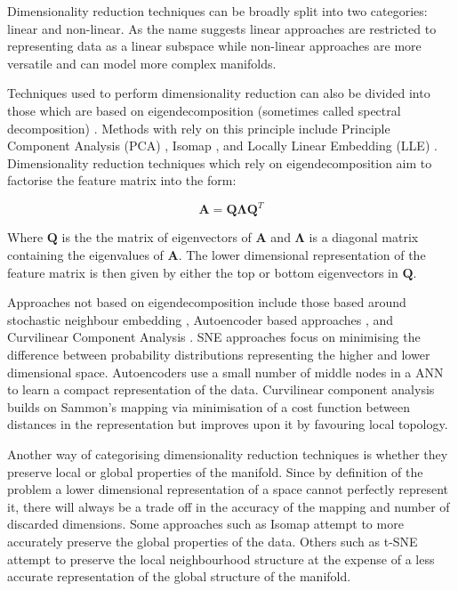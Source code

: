 Dimensionality reduction techniques can be broadly split into two categories: linear and non-linear. As the name suggests linear approaches are restricted to representing data as a linear subspace while non-linear approaches are more versatile and can model more complex manifolds. 

Techniques used to perform dimensionality reduction can also be divided into those which are based on eigendecomposition (sometimes called spectral decomposition)  \cite{strange2014open}. Methods with rely on this principle include Principle Component Analysis (PCA) \cite{shlens2014tutorial}, Isomap \cite{tenenbaum2000global}, and Locally Linear Embedding (LLE) \cite{roweis2000nonlinear}. Dimensionality reduction techniques which rely on eigendecomposition aim to factorise the feature matrix into the form:

\begin{equation}
	\bm{A} = \bm{Q}\bm{\Lambda}\bm{Q}^T
\end{equation}

Where $\bm{Q}$ is the the matrix of eigenvectors of $\bm{A}$ and $\bm{\Lambda}$ is a diagonal matrix containing the eigenvalues of $\bm{A}$. The lower dimensional representation of the feature matrix is then given by either the top or bottom eigenvectors in $\bm{Q}$.

Approaches not based on eigendecomposition include those based around stochastic neighbour embedding \cite{van2008visualizing, hinton2002stochastic}, Autoencoder based approaches \cite{hinton2006reducing}, and Curvilinear Component Analysis \cite{demartines1997curvilinear}. SNE approaches focus on minimising the difference between probability distributions representing the higher and lower dimensional space. Autoencoders use a small number of middle nodes in a ANN to learn a compact representation of the data. Curvilinear component analysis builds on Sammon's mapping via minimisation of a cost function between distances in the representation but improves upon it by favouring local topology.

Another way of categorising dimensionality reduction techniques is whether they preserve local or global properties of the manifold. Since by definition of the problem a lower dimensional representation of a space cannot perfectly represent it, there will always be a trade off in the accuracy of the mapping and number of discarded dimensions. Some approaches such as Isomap attempt to more accurately preserve the global properties of the data. Others such as t-SNE attempt to preserve the local neighbourhood structure at the expense of a less accurate representation of the global structure of the manifold.


